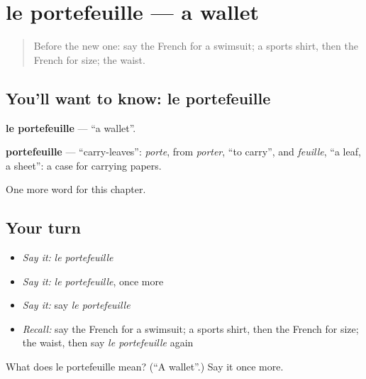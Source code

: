 \section[le portefeuille]{le portefeuille — a wallet}

\label{lesson:FR-C117-portefeuille}



\begin{quote}
Before the new one: say the French for a swimsuit; a sports shirt, then the French for size; the waist.
\end{quote}

\subsection*{You'll want to know: le portefeuille}
\textbf{le portefeuille} — \textquotedblleft{}a wallet\textquotedblright{}.

\begin{cousinweb}
\textbf{portefeuille} — \textquotedblleft{}carry-leaves\textquotedblright{}: \emph{porte}, from \emph{porter}, \textquotedblleft{}to carry\textquotedblright{}, and \emph{feuille}, \textquotedblleft{}a leaf, a sheet\textquotedblright{}: a case for carrying papers.
\end{cousinweb}

\begin{grammarlens}[title={What you've built}]
One more word for this chapter.
\end{grammarlens}

\subsection*{Your turn}
\begin{itemize}
\raggedright
  \item \emph{Say it:} \emph{le portefeuille}
  \item \emph{Say it:} \emph{le portefeuille}, once more
  \item \emph{Say it:} say \emph{le portefeuille}
  \item \emph{Recall:} say the French for a swimsuit; a sports shirt, then the French for size; the waist, then say \emph{le portefeuille} again
\end{itemize}

\begin{tcolorbox}[breakable,colback=teal!4,colframe=teal!35!black,title={Before you move on}]
What does le portefeuille mean? (\textquotedblleft{}A wallet\textquotedblright{}.) Say it once more.
\end{tcolorbox}
